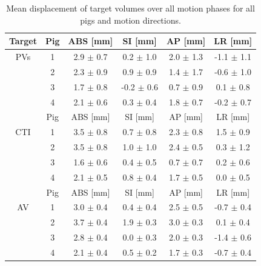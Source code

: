 \newpage

\begin{table}[H]
  \centering
  \small
  \caption{Mean displacement of target volumes over all motion phases for all pigs and motion directions.}
  \begin{tabular}{|c|c|c|c|c|c|}
    \hline\hline
    Target & Pig & ABS [mm] & SI [mm] & AP [mm] & LR [mm] \\
    \hline
    PVs & 1 & 2.9 $\pm$ 0.7 & 0.2 $\pm$ 1.0 & 2.0 $\pm$ 1.3 & -1.1 $\pm$ 1.1 \\
    & 2 & 2.3 $\pm$ 0.9 & 0.9 $\pm$ 0.9 & 1.4 $\pm$ 1.7 & -0.6 $\pm$ 1.0 \\
    & 3 & 1.7 $\pm$ 0.8 & -0.2 $\pm$ 0.6 & 0.7 $\pm$ 0.9 & 0.1 $\pm$ 0.8 \\
    & 4 & 2.1 $\pm$ 0.6 & 0.3 $\pm$ 0.4 & 1.8 $\pm$ 0.7 & -0.2 $\pm$ 0.7 \\
    \hline\hline
    & Pig & ABS [mm] & SI [mm] & AP [mm] & LR [mm] \\
   \hline
    CTI & 1 & 3.5 $\pm$ 0.8 & 0.7 $\pm$ 0.8 & 2.3 $\pm$ 0.8 & 1.5 $\pm$ 0.9 \\
    & 2 & 3.5 $\pm$ 0.8 & 1.0 $\pm$ 1.0 & 2.4 $\pm$ 0.5 & 0.3 $\pm$ 1.2 \\
    & 3 & 1.6 $\pm$ 0.6 & 0.4 $\pm$ 0.5 & 0.7 $\pm$ 0.7 & 0.2 $\pm$ 0.6 \\
    & 4 & 2.1 $\pm$ 0.5 & 0.8 $\pm$ 0.4 & 1.7 $\pm$ 0.5 & 0.0 $\pm$ 0.5 \\
    \hline\hline
   & Pig & ABS [mm] & SI [mm] & AP [mm] & LR [mm] \\
   \hline
    AV & 1 & 3.0 $\pm$ 0.4 & 0.4 $\pm$ 0.4 & 2.5 $\pm$ 0.5 & -0.7 $\pm$ 0.4 \\
    & 2 & 3.7 $\pm$ 0.4 & 1.9 $\pm$ 0.3 & 3.0 $\pm$ 0.3 & 0.1 $\pm$ 0.4 \\
    & 3 & 2.8 $\pm$ 0.4 & 0.0 $\pm$ 0.3 & 2.0 $\pm$ 0.3 & -1.4 $\pm$ 0.6 \\
    & 4 & 2.1 $\pm$ 0.4 & 0.5 $\pm$ 0.2 & 1.7 $\pm$ 0.3 & -0.7 $\pm$ 0.4 \\
    \hline\hline
  \end{tabular}
  \label{tab:motion_allpigs}
\end{table}

\vspace*{0.4cm}

